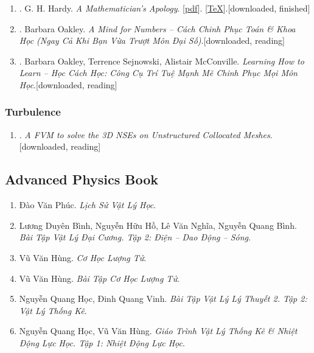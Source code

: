 \documentclass{article}
\begin{document}
\begin{enumerate}
	\item \cite{Hardy1940, Hardy1992, Hardy2022}. G. H. Hardy. \textit{A Mathematician's Apology}. [\href{https://github.com/NQBH/hobby/blob/master/advanced_mathematics/Hardy2017/NQBH_Hardy2017.pdf}{pdf}]. [\href{https://github.com/NQBH/hobby/blob/master/advanced_mathematics/Hardy2017/NQBH_Hardy2017.tex}{\TeX}].\hfill\textsf{[downloaded, finished]}
	\item \cite{Oakley2022}. Barbara Oakley. \textit{A Mind for Numbers -- Cách Chinh Phục Toán \& Khoa Học (Ngay Cả Khi Bạn Vừa Trượt Môn Đại Số)}.\hfill\textsf{[downloaded, reading]}
	\item \cite{Oakley_Sejnowski_McConville2022}. Barbara Oakley, Terrence Sejnowski, Alistair McConville. \textit{Learning How to Learn -- Học Cách Học: Công Cụ Trí Tuệ Mạnh Mẽ Chinh Phục Mọi Môn Học}.\hfill\textsf{[downloaded, reading]}
\end{enumerate}

\subsubsection{Turbulence}

\begin{enumerate}
	\item \cite{Perron_Boivin_Herard2004}. \textit{A FVM to solve the 3{D} NSEs on Unstructured Collocated Meshes}.\hfill\textsf{[downloaded, reading]}
\end{enumerate}


\subsection{Advanced Physics Book}

\begin{enumerate}
	\item Đào Văn Phúc. \textit{Lịch Sử Vật Lý Học}.
	\item Lương Duyên Bình, Nguyễn Hữu Hồ, Lê Văn Nghĩa, Nguyễn Quang Bình. \textit{Bài Tập Vật Lý Đại Cương. Tập 2: Điện -- Dao Động -- Sóng}.
	\item Vũ Văn Hùng. \textit{Cơ Học Lượng Tử}.
	\item Vũ Văn Hùng. \textit{Bài Tập Cơ Học Lượng Tử}.
	\item Nguyễn Quang Học, Đinh Quang Vinh. \textit{Bài Tập Vật Lý Lý Thuyết 2. Tập 2: Vật Lý Thống Kê}.
	\item Nguyễn Quang Học, Vũ Văn Hùng. \textit{Giáo Trình Vật Lý Thống Kê \& Nhiệt Động Lực Học. Tập 1: Nhiệt Động Lực Học}.
\end{enumerate}
\end{document}
